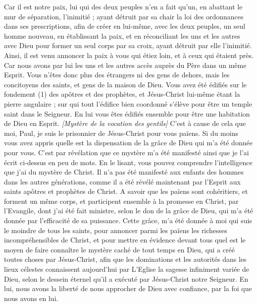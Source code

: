 \begin{multicols}{2}
Car il est notre paix, lui qui des deux peuples n’en a fait qu’un, en abattant le mur de séparation, l’inimitié ;
ayant détruit par sa chair la loi des ordonnances dans ses prescriptions, afin de créer en lui-même, avec les deux peuples, un seul homme nouveau, en établissant la paix,
et en réconciliant les uns et les autres avec Dieu pour former un seul corps par sa croix, ayant détruit par elle l'inimitié.
Ainsi, il est venu annoncer la paix à vous qui étiez loin, et à ceux qui étaient près.
Car nous avons par lui les uns et les autres accès auprès du Père dans un même Esprit.
Vous n'êtes donc plus des étrangers ni des gens de dehors, mais les concitoyens des saints, et gens de la maison de Dieu.
Vous avez été édifiés sur le fondement (1) des apôtres et des prophètes, et Jésus-Christ lui-même étant la pierre angulaire ;
sur qui tout l'édifice bien coordonné s'élève pour être un temple saint dans le Seigneur.
En lui vous êtes édifiés ensemble pour être une habitation de Dieu en Esprit.
\textit{[Mystère de la vocation des gentils]}
\VerseOne{}C’est à cause de cela que moi, Paul, je suis le prisonnier de Jésus-Christ pour vous païens.
Si du moins vous avez appris quelle est la dispensation de la grâce de Dieu qui m'a été donnée pour vous.
C’est par révélation que ce mystère m'a été manifesté ainsi que je l'ai écrit ci-dessus en peu de mots.
En le lisant, vous pouvez comprendre l'intelligence que j'ai du mystère de Christ.
Il n'a pas été manifesté aux enfants des hommes dans les autres générations, comme il a été révélé maintenant par l'Esprit aux saints apôtres et prophètes de Christ.
A savoir que les païens sont cohéritiers, et forment un même corps, et participent ensemble à la promesse en Christ, par l'Evangile,
dont j'ai été fait ministre, selon le don de la grâce de Dieu, qui m'a été donnée par l’efficacité de sa puissance.
Cette grâce, m'a été donnée à moi qui suis le moindre de tous les saints, pour annoncer parmi les païens les richesses incompréhensibles de Christ,
et pour mettre en évidence devant tous quel est le moyen de faire connaître le mystère caché de tout temps en Dieu, qui a créé toutes choses par Jésus-Christ,
afin que les dominations et les autorités dans les lieux célestes connaissent aujourd’hui par L’Eglise la sagesse infiniment variée de Dieu,
selon le dessein éternel qu’il a exécuté par Jésus-Christ notre Seigneur.
En lui, nous avons la liberté de nous approcher de Dieu avec confiance, par la foi que nous avons en lui.

\end{multicols}

